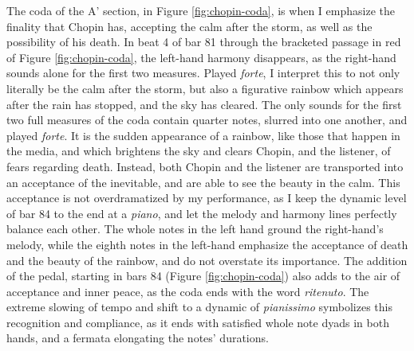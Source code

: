 The coda of the A' section, in Figure \ref{fig:chopin-coda}\autocite{Hansen_1973}, is when I emphasize the finality that Chopin has, accepting the calm after the storm, as well as the possibility of his death. In beat 4 of bar 81 through the bracketed passage in red of Figure \ref{fig:chopin-coda}\autocite{Hansen_1973}, the left-hand harmony disappears, as the right-hand sounds alone for the first two measures. Played \textit{forte}, I interpret this to not only literally be the calm after the storm, but also a figurative rainbow which appears after the rain has stopped, and the sky has cleared. The only sounds for the first two full measures of the coda contain quarter notes, slurred into one another, and played \textit{forte}. It is the sudden appearance of a rainbow, like those that happen in the media, and which brightens the sky and clears Chopin, and the listener, of fears regarding death. Instead, both Chopin and the listener are transported into an acceptance of the inevitable, and are able to see the beauty in the calm. This acceptance is not overdramatized by my performance, as I keep the dynamic level of bar 84 to the end at a \textit{piano}, and let the melody and harmony lines perfectly balance each other. The whole notes in the left hand ground the right-hand's melody, while the eighth notes in the left-hand emphasize the acceptance of death and the beauty of the rainbow, and do not overstate its importance. The addition of the pedal, starting in bars 84 (Figure \ref{fig:chopin-coda}\autocite{Hansen_1973}) also adds to the air of acceptance and inner peace, as the coda ends with the word \textit{ritenuto}. The extreme slowing of tempo and shift to a dynamic of \textit{pianissimo} symbolizes this recognition and compliance, as it ends with satisfied whole note dyads in both hands, and a fermata elongating the notes' durations.
%

